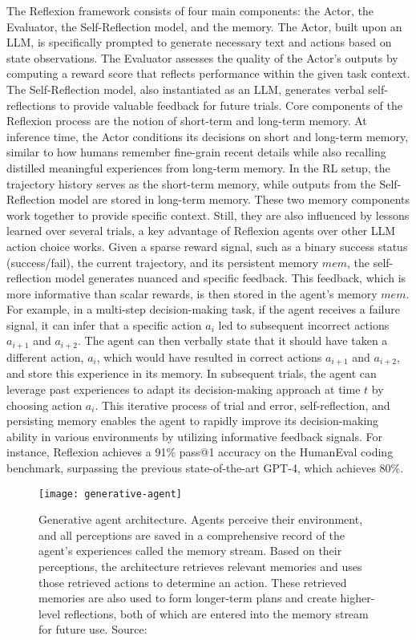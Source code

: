 The Reflexion framework consists of four main components: the Actor, the Evaluator, the Self-Reflection model, and the memory.
The Actor, built upon an LLM, is specifically prompted to generate necessary text and actions based on state observations.
The Evaluator assesses the quality of the Actor's outputs by computing a reward score that reflects performance within the given task context.
The Self-Reflection model, also instantiated as an LLM, generates verbal self-reflections to provide valuable feedback for future trials.
Core components of the Reflexion process are the notion of short-term and long-term memory.
At inference time, the Actor conditions its decisions on short and long-term memory, similar to how humans remember fine-grain recent details while also recalling distilled meaningful experiences from long-term memory.
In the RL setup, the trajectory history serves as the short-term memory, while outputs from the Self-Reflection model are stored in long-term memory.
These two memory components work together to provide specific context. Still, they are also influenced by lessons learned over several trials, a key advantage of Reflexion agents over other LLM action choice works.
Given a sparse reward signal, such as a binary success status (success/fail), the current trajectory, and its persistent memory \(mem\), the self-reflection model generates nuanced and specific feedback.
This feedback, which is more informative than scalar rewards, is then stored in the agent’s memory \(mem\).
For example, in a multi-step decision-making task, if the agent receives a failure signal, it can infer that a specific action \(a_i\) led to subsequent incorrect actions \(a_{i+1}\) and \(a_{i+2}\).
The agent can then verbally state that it should have taken a different action, \(a_i\), which would have resulted in correct actions \(a_{i+1}\) and \(a_{i+2}\), and store this experience in its memory.
In subsequent trials, the agent can leverage past experiences to adapt its decision-making approach at time \(t\) by choosing action \(a_i\).
This iterative process of trial and error, self-reflection, and persisting memory enables the agent to rapidly improve its decision-making ability in various environments by utilizing informative feedback signals.
For instance, Reflexion achieves a 91\% pass@1 accuracy on the HumanEval coding benchmark, surpassing the previous state-of-the-art GPT-4, which achieves 80\%.

\begin{figure}[h!]
	\centering
	\texttt{[image: generative-agent]}
	\caption{Generative agent architecture. Agents perceive their environment, and all perceptions are saved in a comprehensive record of the agent’s experiences called the memory stream. Based on their perceptions, the architecture retrieves relevant memories and uses those retrieved actions to determine an action. These retrieved memories are also used to form longer-term plans and create higher-level reflections, both of which are entered into the memory stream for future use. Source: \textcite{park2023generativeagentsinteractivesimulacra}}
	\label{fig:generative-agents}
\end{figure}

